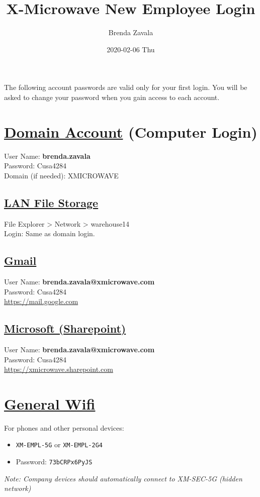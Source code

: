 \documentclass[11pt]{article}
\author{Brenda Zavala}
\date{2020-02-06 Thu}
\title{X-Microwave New Employee Login}
\begin{document}
\maketitle
The following account passwords are valid only for your first login. You will be asked to change your password when you gain access to each account.
\section*{\underline{Domain Account} (Computer Login)}
\label{sec:orgcdee16d}
User Name: \textbf{\MakeLowercase{Brenda}.\MakeLowercase{Zavala}} \\
Password: Cusa4284 \\
Domain (if needed): XMICROWAVE

\subsection*{\underline{LAN File Storage}}
\label{sec:orgb3e247a}
File Explorer > Network > warehouse14 \\
Login: Same as domain login.

\subsection*{\underline{Gmail}}
\label{sec:orgb45f2d6}
User Name: \textbf{\MakeLowercase{Brenda}.\MakeLowercase{Zavala}@xmicrowave.com} \\
Password: Cusa4284 \\
\url{https://mail.google.com}

\subsection*{\underline{Microsoft (Sharepoint)}}
\label{sec:orgc15b9e3}
User Name: \textbf{\MakeLowercase{Brenda}.\MakeLowercase{Zavala}@xmicrowave.com} \\
Password: Cusa4284 \\
\url{https://xmicrowave.sharepoint.com}
\section*{\underline{General Wifi}}
\label{sec:org186c051}
For phones and other personal devices:
\begin{itemize}
\item \texttt{XM-EMPL-5G} or \texttt{XM-EMPL-2G4}
\item Password: \texttt{73bCRPx6PyJS}
\end{itemize}
\emph{Note: Company devices should automatically connect to XM-SEC-5G (hidden network)}
\end{document}
